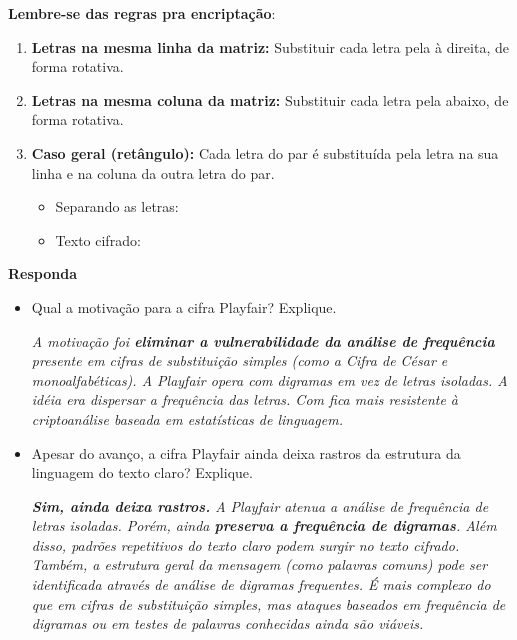 \textbf{Lembre-se das regras pra encriptação}:
\begin{enumerate}

    \item \textbf{Letras na mesma linha da matriz:} Substituir cada letra pela à direita, de forma rotativa.


    \item \textbf{Letras na mesma coluna da matriz:} Substituir cada letra pela abaixo, de forma rotativa.

    \item \textbf{Caso geral (retângulo):} Cada letra do par é substituída pela letra na sua linha e na coluna da outra letra do par.

          \begin{itemize}
              \item Separando as letras:  
              \item Texto cifrado: 
          \end{itemize}


\end{enumerate}

\textbf{Responda}
\begin{itemize}
    \item Qual a motivação para a cifra Playfair? Explique.

          \textit{A motivação foi \textbf{eliminar a vulnerabilidade da análise de frequência} presente em cifras de substituição simples (como a Cifra de César e monoalfabéticas). A Playfair opera com digramas em vez de letras isoladas. A idéia era dispersar a frequência das letras. Com fica mais resistente à criptoanálise baseada em estatísticas de linguagem.
          }

    \item Apesar do avanço, a cifra Playfair ainda deixa rastros da estrutura da linguagem do texto claro? Explique.

          \textit{\textbf{Sim, ainda deixa rastros.} A Playfair atenua a análise de frequência de letras isoladas. Porém, ainda \textbf{preserva a frequência de digramas}. Além disso, padrões repetitivos do texto claro podem surgir no texto cifrado. Também, a estrutura geral da mensagem (como palavras comuns) pode ser identificada através de análise de digramas frequentes. É mais complexo do que em cifras de substituição simples, mas ataques baseados em frequência de digramas ou em testes de palavras conhecidas ainda são viáveis.}
\end{itemize}

